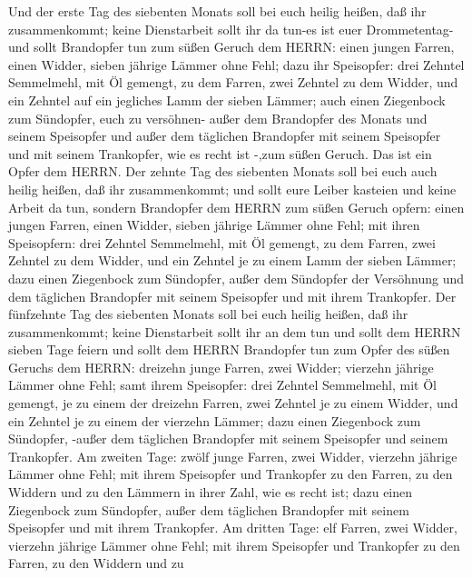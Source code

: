  Und der erste Tag des siebenten Monats soll bei euch heilig
heißen, daß ihr zusammenkommt; keine Dienstarbeit sollt ihr da tun-es
ist euer Drommetentag-  und sollt Brandopfer tun zum süßen
Geruch dem HERRN: einen jungen Farren, einen Widder, sieben jährige
Lämmer ohne Fehl;  dazu ihr Speisopfer: drei Zehntel
Semmelmehl, mit Öl gemengt, zu dem Farren, zwei Zehntel zu dem Widder,
 und ein Zehntel auf ein jegliches Lamm der sieben Lämmer;
 auch einen Ziegenbock zum Sündopfer, euch zu versöhnen-
 außer dem Brandopfer des Monats und seinem Speisopfer und
außer dem täglichen Brandopfer mit seinem Speisopfer und mit seinem
Trankopfer, wie es recht ist -,zum süßen Geruch. Das ist ein Opfer dem
HERRN.  Der zehnte Tag des siebenten Monats soll bei euch
auch heilig heißen, daß ihr zusammenkommt; und sollt eure Leiber
kasteien und keine Arbeit da tun,  sondern Brandopfer dem
HERRN zum süßen Geruch opfern: einen jungen Farren, einen Widder, sieben
jährige Lämmer ohne Fehl;  mit ihren Speisopfern: drei
Zehntel Semmelmehl, mit Öl gemengt, zu dem Farren, zwei Zehntel zu dem
Widder,  und ein Zehntel je zu einem Lamm der sieben
Lämmer;  dazu einen Ziegenbock zum Sündopfer, außer dem
Sündopfer der Versöhnung und dem täglichen Brandopfer mit seinem
Speisopfer und mit ihrem Trankopfer.  Der fünfzehnte Tag
des siebenten Monats soll bei euch heilig heißen, daß ihr zusammenkommt;
keine Dienstarbeit sollt ihr an dem tun und sollt dem HERRN sieben Tage
feiern  und sollt dem HERRN Brandopfer tun zum Opfer des
süßen Geruchs dem HERRN: dreizehn junge Farren, zwei Widder; vierzehn
jährige Lämmer ohne Fehl;  samt ihrem Speisopfer: drei
Zehntel Semmelmehl, mit Öl gemengt, je zu einem der dreizehn Farren,
zwei Zehntel je zu einem Widder,  und ein Zehntel je zu
einem der vierzehn Lämmer;  dazu einen Ziegenbock zum
Sündopfer, -außer dem täglichen Brandopfer mit seinem Speisopfer und
seinem Trankopfer.  Am zweiten Tage: zwölf junge Farren,
zwei Widder, vierzehn jährige Lämmer ohne Fehl;  mit ihrem
Speisopfer und Trankopfer zu den Farren, zu den Widdern und zu den
Lämmern in ihrer Zahl, wie es recht ist;  dazu einen
Ziegenbock zum Sündopfer, außer dem täglichen Brandopfer mit seinem
Speisopfer und mit ihrem Trankopfer.  Am dritten Tage: elf
Farren, zwei Widder, vierzehn jährige Lämmer ohne Fehl; 
mit ihrem Speisopfer und Trankopfer zu den Farren, zu den Widdern und zu
